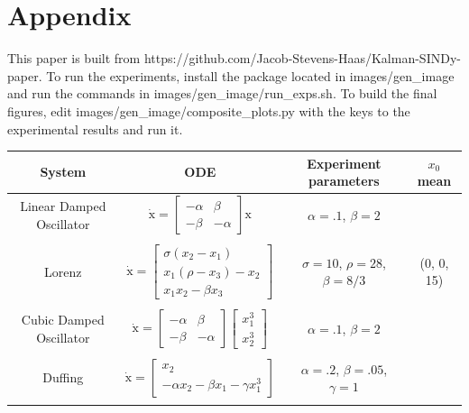 \documentclass{ACCESS_latex_template_20231118/ieeeaccess}
\renewcommand{\vec}[1]{\boldsymbol{\mathrm{#1}}}
\begin{document}
\section*{Appendix}
This paper is built from https://github.com/Jacob-Stevens-Haas/Kalman-SINDy-paper.
To run the experiments, install the package located in images/gen\_image and run the commands in images/gen\_image/run\_exps.sh.  To build the final figures, edit images/gen\_image/composite\_plots.py with the keys to the experimental results and run it.

\begin{table}[ht]
    \centering
    \label{tab:ODEs}
    \begin{tabular}{c c c c}
        System & ODE & Experiment parameters & $x_0$ mean\\
        \hline\hline
        Linear Damped Oscillator
            & $\dot {\vec x} = \left[\begin{matrix}-\alpha & \beta \\ -\beta & -\alpha\end{matrix}\right] \vec x$
            & $\alpha = .1$, $\beta=2 $\\\\
        Lorenz
            & $\dot {\vec x} = \left[\begin{matrix}
                \sigma (x_2 - x_1)\\
                x_1(\rho - x_3) - x_2\\
                x_1 x_2 - \beta x_3
            \end{matrix}\right]$
            & $\sigma=10$, $\rho=28$, $\beta=8/3$
            & (0, 0, 15)\\\\
        Cubic Damped Oscillator
            & $\dot {\vec x} = \left[\begin{matrix}-\alpha & \beta \\ -\beta & -\alpha\end{matrix}\right] \left[\begin{matrix}x_1^3\\x_2^3\end{matrix}\right]$
            & $\alpha = .1$, $\beta=2 $\\\\
        Duffing
            & $\dot {\vec x} = \left[\begin{matrix}x_2 \\ -\alpha x_2 - \beta x_1 -\gamma x_1^3\end{matrix}\right]$
            & $\alpha = .2$, $\beta=.05 $, $\gamma=1$\\\\

\end{tabular}
\end{table}
\end{document}
